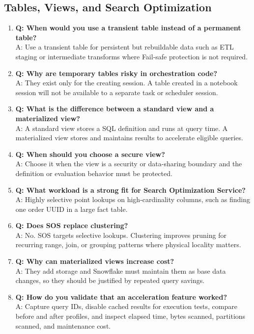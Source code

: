 \subsection{Tables, Views, and Search Optimization}
\begin{enumerate}
    \item \textbf{Q: When would you use a transient table instead of a permanent table?}\\
    A: Use a transient table for persistent but rebuildable data such as ETL staging or intermediate transforms where Fail-safe protection is not required.
    \item \textbf{Q: Why are temporary tables risky in orchestration code?}\\
    A: They exist only for the creating session. A table created in a notebook session will not be available to a separate task or scheduler session.
    \item \textbf{Q: What is the difference between a standard view and a materialized view?}\\
    A: A standard view stores a SQL definition and runs at query time. A materialized view stores and maintains results to accelerate eligible queries.
    \item \textbf{Q: When should you choose a secure view?}\\
    A: Choose it when the view is a security or data-sharing boundary and the definition or evaluation behavior must be protected.
    \item \textbf{Q: What workload is a strong fit for Search Optimization Service?}\\
    A: Highly selective point lookups on high-cardinality columns, such as finding one order UUID in a large fact table.
    \item \textbf{Q: Does SOS replace clustering?}\\
    A: No. SOS targets selective lookups. Clustering improves pruning for recurring range, join, or grouping patterns where physical locality matters.
    \item \textbf{Q: Why can materialized views increase cost?}\\
    A: They add storage and Snowflake must maintain them as base data changes, so they should be justified by repeated query savings.
    \item \textbf{Q: How do you validate that an acceleration feature worked?}\\
    A: Capture query IDs, disable cached results for execution tests, compare before and after profiles, and inspect elapsed time, bytes scanned, partitions scanned, and maintenance cost.
\end{enumerate}
